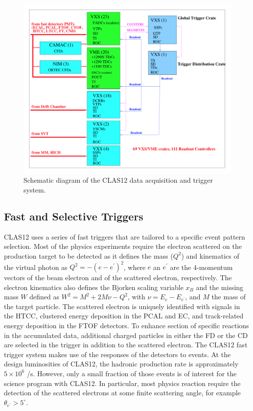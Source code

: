 \documentclass[final,3p,twocolumn]{elsarticle}
\begin{document}
\begin{figure}[htbp!]
\centerline{\includegraphics[width=1.0\columnwidth]{clas12-daq.png}}
\caption{Schematic diagram of the CLAS12 data acquisition and trigger system.}
\label{daq}
\end{figure}


\subsection{\rm Fast and Selective Triggers} 

CLAS12 uses a series of fast triggers that are tailored to a specific event pattern selection. Most of 
the physics experiments require the electron scattered on the production target to be detected as it defines
the mass ($Q^2$) and kinematics of the virtual photon as $Q^2 = -(e - e^\prime)^2$, where $e$ an $e^\prime$ are 
the 4-momentum vectors of the beam electron and of the scattered electron, respectively. The electron kinematics 
also defines the Bjorken scaling variable $x_B$  and the missing mass $W$ defined as $W^2 = M^2 + 2M\nu - Q^2$,
with $\nu = E_e - E_{e^\prime}$, and $M$ the mass of the target particle. The scattered electron is uniquely identified
with signals in the HTCC, clustered energy deposition  in the PCAL and EC, and track-related energy deposition 
in the FTOF detectors.   
To enhance section of specific reactions in the accumulated data, additional charged particles in either the FD or 
the CD are selected in the trigger in addition to the 
scattered electron. The CLAS12 fast trigger system makes use of the responses of the detectors to events. 
At the design luminosities of 
CLAS12, the hadronic production rate is approximately $5 \times 10^6$ /s. 
However, only a small fraction of those events is of interest for the science program with CLAS12. In particular, most 
physics reaction require the detection of the scattered electrons at some finite scattering angle, for example 
$\theta_{e^\prime} > 5^\circ$.  
   
\end{document}
